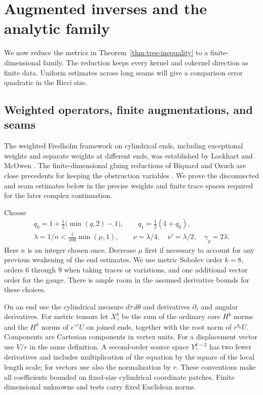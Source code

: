 \section{Augmented inverses and the analytic family}
\label{sec:family}

We now reduce the metrics in Theorem~\ref{thm:tree-inequality} to a finite-dimensional family. The reduction keeps every kernel and cokernel direction as finite data. Uniform estimates across long seams will give a comparison error quadratic in the Ricci size.

\subsection{Weighted operators, finite augmentations, and seams}
\label{ell:inverses}

The weighted Fredholm framework on cylindrical ends, including
exceptional weights and separate weights at different ends, was
established by Lockhart and McOwen
\cite[Theorems~1.1, 6.2, and~8.1]{LockhartMcOwen1985}.
The finite-dimensional gluing reductions of Biquard and Ozuch are
close precedents for keeping the obstruction variables
\cite[arXiv version, Proposition~8.1]{Biquard2011}
\cite[arXiv version, Theorem~4.6]{Ozuch2022II}.
We prove the disconnected and seam estimates below in the precise
weights and finite trace spaces required for the later complex
continuation.

Choose
\[
 \begin{gathered}
 q_0=1+\tfrac12\bigl(\min(q,2)-1\bigr),\qquad
 q_1=\tfrac12(1+q_0),\\
 \lambda=1/n<\tfrac1{100}\min(\mu,1),\qquad
 \nu=\lambda/4,\quad \nu'=\lambda/2,\quad \gamma_g=2\lambda.
 \end{gathered}
\]
Here $n$ is an integer chosen once.  Decrease $\mu$ first if
necessary to account for any previous weakening of the end estimates.
We use metric Sobolev order $k=8$, orders $6$ through $9$ when taking
traces or variations, and one additional vector order for the gauge.
There is ample room in the assumed derivative bounds for these choices.

On an end use the cylindrical measure $d\tau\,d\theta$ and derivatives
$\partial_\tau$ and angular derivatives.  For metric tensors let
$X^k_\gamma$ be the sum of the ordinary core $H^k$ norms and the
$H^k$ norms of $e^{\gamma\tau}U$ on joined ends, together with the
root norm of $r^{q_0}U$.  Components are Cartesian components in
vertex units.  For a displacement vector use $V/r$ in the same
definition.  A second-order source space $Y^{k-2}_\gamma$ has two
fewer derivatives and includes multiplication of the equation by
the square of the local length scale; for vectors use also the
normalization by $r$.  These conventions make all coefficients
bounded on fixed-size cylindrical coordinate patches.  Finite
dimensional unknowns and tests carry fixed Euclidean norms.

